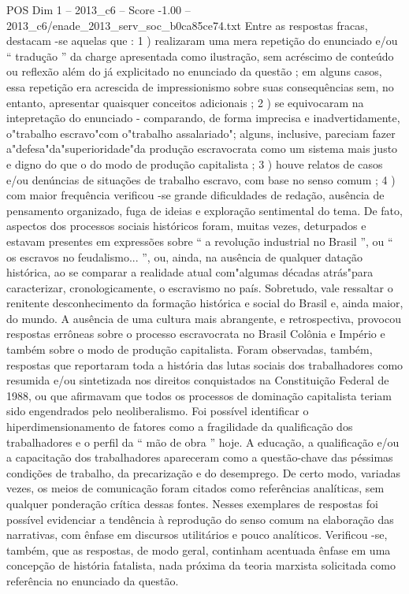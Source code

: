 \begin{textsample}{POS Dim 1 – 2013\_c6 – Score -1.00 – 2013\_c6/enade\_2013\_serv\_soc\_b0ca85ce74.txt}
Entre as respostas fracas, destacam -se aquelas que : 1 ) realizaram uma mera repetição do enunciado e/ou “ tradução ” da charge apresentada como ilustração, sem acréscimo de conteúdo ou reflexão além do já explicitado no enunciado da questão ; em alguns casos, essa repetição era acrescida de impressionismo sobre suas consequências sem, no entanto, apresentar quaisquer conceitos adicionais ; 2 ) se equivocaram na intepretação do enunciado - comparando, de forma imprecisa e inadvertidamente, o"trabalho escravo"com o"trabalho assalariado"; alguns, inclusive, pareciam fazer a"defesa"da"superioridade"da produção escravocrata como um sistema mais justo e digno do que o do modo de produção capitalista ; 3 ) houve relatos de casos e/ou denúncias de situações de trabalho escravo, com base no senso comum ; 4 ) com maior frequência verificou -se grande dificuldades de redação, ausência de pensamento organizado, fuga de ideias e exploração sentimental do tema.
De fato, aspectos dos processos sociais históricos foram, muitas vezes, deturpados e estavam presentes em expressões sobre “ a revolução industrial no Brasil ”, ou “ os escravos no feudalismo... ”, ou, ainda, na ausência de qualquer datação histórica, ao se comparar a realidade atual com"algumas décadas atrás"para caracterizar, cronologicamente, o escravismo no país.
Sobretudo, vale ressaltar o renitente desconhecimento da formação histórica e social do Brasil e, ainda maior, do mundo.
A ausência de uma cultura mais abrangente, e retrospectiva, provocou respostas errôneas sobre o processo escravocrata no Brasil Colônia e Império e também sobre o modo de produção capitalista.
Foram observadas, também, respostas que reportaram toda a história das lutas sociais dos trabalhadores como resumida e/ou sintetizada nos direitos conquistados na Constituição Federal de 1988, ou que afirmavam que todos os processos de dominação capitalista teriam sido engendrados pelo neoliberalismo.
Foi possível identificar o hiperdimensionamento de fatores como a fragilidade da qualificação dos trabalhadores e o perfil da “ mão de obra ” hoje.
A educação, a qualificação e/ou a capacitação dos trabalhadores apareceram como a questão-chave das péssimas condições de trabalho, da precarização e do desemprego.
De certo modo, variadas vezes, os meios de comunicação foram citados como referências analíticas, sem qualquer ponderação crítica dessas fontes.
Nesses exemplares de respostas foi possível evidenciar a tendência à reprodução do senso comum na elaboração das narrativas, com ênfase em discursos utilitários e pouco analíticos.
Verificou -se, também, que as respostas, de modo geral, continham acentuada ênfase em uma concepção de história fatalista, nada próxima da teoria marxista solicitada como referência no enunciado da questão.

\end{textsample}
